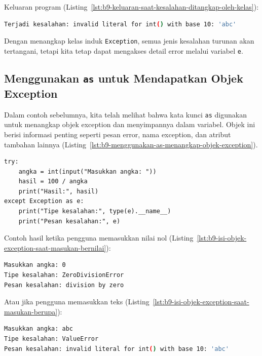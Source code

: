 Keluaran program (Listing~\ref{lst:b9-keluaran-saat-kesalahan-ditangkap-oleh-kelas}):

\begin{lstlisting}[language=bash, caption={Keluaran saat kesalahan ditangkap oleh kelas induk}, label={lst:b9-keluaran-saat-kesalahan-ditangkap-oleh-kelas}]
Terjadi kesalahan: invalid literal for int() with base 10: 'abc'
\end{lstlisting}

Dengan menangkap kelas induk \texttt{Exception}, semua jenis kesalahan turunan akan tertangani, tetapi kita tetap dapat mengakses detail error melalui variabel \texttt{e}.

\subsection*{Menggunakan \texttt{as} untuk Mendapatkan Objek Exception}

Dalam contoh sebelumnya, kita telah melihat bahwa kata kunci \texttt{as} digunakan untuk menangkap objek exception dan menyimpannya dalam variabel. Objek ini berisi informasi penting seperti pesan error, nama exception, dan atribut tambahan lainnya (Listing~\ref{lst:b9-menggunakan-as-menangkap-objek-exception}).

\begin{lstlisting}[style=PythonStyle, caption={Menggunakan 'as' untuk menangkap objek exception}, label={lst:b9-menggunakan-as-menangkap-objek-exception}]
try:
    angka = int(input("Masukkan angka: "))
    hasil = 100 / angka
    print("Hasil:", hasil)
except Exception as e:
    print("Tipe kesalahan:", type(e).__name__)
    print("Pesan kesalahan:", e)
\end{lstlisting}

Contoh hasil ketika pengguna memasukkan nilai nol (Listing~\ref{lst:b9-isi-objek-exception-saat-masukan-bernilai}):

\begin{lstlisting}[language=bash, caption={Isi objek exception saat masukan bernilai nol}, label={lst:b9-isi-objek-exception-saat-masukan-bernilai}]
Masukkan angka: 0
Tipe kesalahan: ZeroDivisionError
Pesan kesalahan: division by zero
\end{lstlisting}

Atau jika pengguna memasukkan teks (Listing~\ref{lst:b9-isi-objek-exception-saat-masukan-berupa}):

\begin{lstlisting}[language=bash, caption={Isi objek exception saat masukan berupa teks}, label={lst:b9-isi-objek-exception-saat-masukan-berupa}]
Masukkan angka: abc
Tipe kesalahan: ValueError
Pesan kesalahan: invalid literal for int() with base 10: 'abc'
\end{lstlisting}

